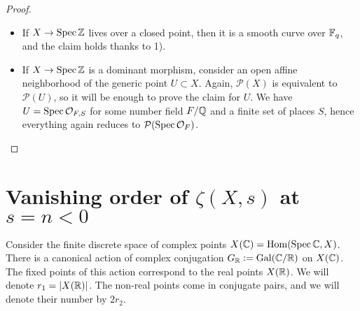 \documentclass[draft]{article}
\numberwithin{equation}{section}
\begin{document}
\begin{lemma}
\begin{proof}
    \begin{itemize}
    \item If $X \to \operatorname{Spec} \mathbb{Z}$ lives over a closed point, then it is a smooth
      curve over $\mathbb{F}_q$, and the claim holds thanks to 1).

    \item If $X \to \operatorname{Spec} \mathbb{Z}$ is a dominant morphism, consider an open affine
      neighborhood of the generic point $U \subset X$. Again, $\mathcal{P} (X)$
      is equivalent to $\mathcal{P} (U)$, so it will be enough to prove the
      claim for $U$. We have $U = \operatorname{Spec} \mathcal{O}_{F,S}$ for some number field
      $F/\mathbb{Q}$ and a finite set of places $S$, hence everything again reduces to
      $\mathcal{P} (\operatorname{Spec} \mathcal{O}_F)$. \qedhere
    \end{itemize}
  \end{proof}
\end{lemma}


\section{Vanishing order of $\zeta (X,s)$ at $s = n < 0$}

Consider the finite discrete space of complex points
$X(\mathbb{C}) = \operatorname{Hom} (\operatorname{Spec} \mathbb{C}, X)$. There is a canonical action of complex
conjugation $G_{\mathbb{R}} \mathrel{\mathop:}= \operatorname{Gal} (\mathbb{C}/\mathbb{R})$ on $X(\mathbb{C})$. The fixed points of this
action correspond to the real points $X (\mathbb{R})$. We will denote
$r_1 = |X (\mathbb{R})|$. The non-real points come in conjugate pairs, and we will
denote their number by $2 r_2$.
\end{document}
